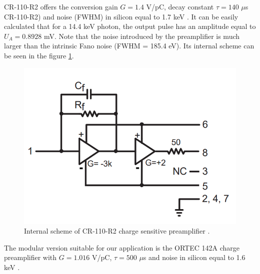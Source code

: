 CR-110-R2 offers the conversion gain $G = 1.4$ V/pC, decay constant $\tau = 140$ $\mu$s CR-110-R2) and noise (FWHM) in silicon equal to 1.7 keV \cite{cr110}. It can be easily calculated that for a 14.4 keV photon, the output pulse has an amplitude equal to $U_{A} = 0.8928$ mV. Note that the noise introduced by the preamplifier is much larger than the intrinsic Fano noise (FWHM = 185.4 eV).  Its internal scheme can be seen in the figure \ref{internal}.   

\begin{figure}[H]
 \centering
 \includegraphics[scale=0.35, angle = 0]{./pictures/CRpreamp.png}
 \caption{Internal scheme of CR-110-R2 charge sensitive preamplifier \cite{cr110}.}
 \label{internal}
 
\end{figure}
\par
The modular version suitable for our application is the ORTEC 142A charge preamplifier with $G = 1.016$ V/pC, $\tau = 500$ $\mu$s and noise in silicon equal to 1.6 keV \cite{ORTECpreamp}.


